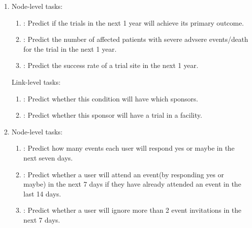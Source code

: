 \begin{enumerate}
    Link-level tasks:
    \begin{enumerate}
    \item \userPostComment: Predict a list of existing posts that a user will comment in the next
    two years.
    \item \postPostLinked: Predict a list of existing posts that users will link a given post to in the next
    two years.
    \end{enumerate}

\item \trials

    Node-level tasks:
    \begin{enumerate}
    \item \studyOutcome: Predict if the trials in the next 1 year will achieve its primary outcome.
    \item \studyAdverse: Predict the number of affected patients with severe advsere events/death for the trial in the next 1 year.
    \item \facilitySuccess: Predict the success rate of a trial site in the next 1 year.
    \end{enumerate}

    Link-level tasks:
    \begin{enumerate}
    \item \sponsorConditionRec: Predict whether this condition will have which sponsors.
    \item \sponsorFacilityRec: Predict whether this sponsor will have a trial in a facility.
    \end{enumerate}
    
\item \event

    Node-level tasks:
    \begin{enumerate}
    \item \userAttendance: Predict how many events each user will respond yes or maybe in the next seven days.
    \item \userRepeat: Predict whether a user will attend an event(by responding yes or maybe) in the next 7 days if they have already attended an event in the last 14 days.
    \item \userIgnore: Predict whether a user will ignore more than 2 event invitations
    in the next 7 days.
    \end{enumerate}

    
\end{enumerate}

